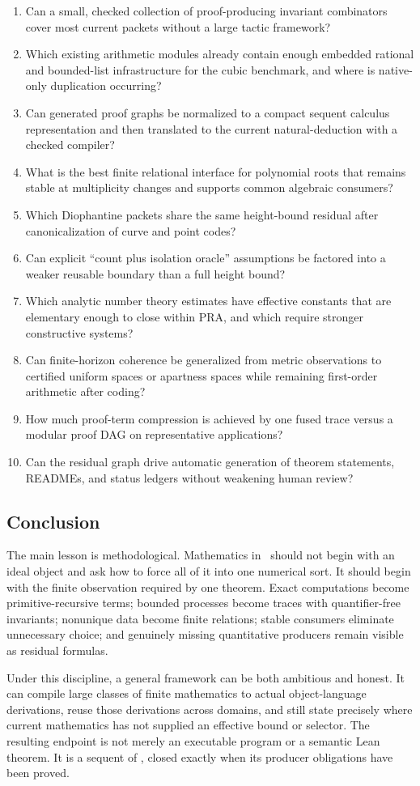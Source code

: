 \begin{enumerate}
\item Can a small, checked collection of proof-producing invariant combinators cover most current packets without a large tactic framework?
\item Which existing arithmetic modules already contain enough embedded rational and bounded-list infrastructure for the cubic benchmark, and where is native-only duplication occurring?
\item Can generated proof graphs be normalized to a compact sequent calculus representation and then translated to the current natural-deduction  with a checked compiler?
\item What is the best finite relational interface for polynomial roots that remains stable at multiplicity changes and supports common algebraic consumers?
\item Which Diophantine packets share the same height-bound residual after canonicalization of curve and point codes?
\item Can explicit ``count plus isolation oracle'' assumptions be factored into a weaker reusable boundary than a full height bound?
\item Which analytic number theory estimates have effective constants that are elementary enough to close within PRA, and which require stronger constructive systems?
\item Can finite-horizon coherence be generalized from metric observations to certified uniform spaces or apartness spaces while remaining first-order arithmetic after coding?
\item How much proof-term compression is achieved by one fused trace versus a modular proof DAG on representative applications?
\item Can the residual graph drive automatic generation of theorem statements, READMEs, and status ledgers without weakening human review?
\end{enumerate}

\subsection{Conclusion}

The main lesson is methodological.  Mathematics in \iPRA\ should not begin with an ideal object and ask how to force all of it into one numerical sort.  It should begin with the finite observation required by one theorem.  Exact computations become primitive-recursive terms; bounded processes become traces with quantifier-free invariants; nonunique data become finite relations; stable consumers eliminate unnecessary choice; and genuinely missing quantitative producers remain visible as residual formulas.

Under this discipline, a general framework can be both ambitious and honest.  It can compile large classes of finite mathematics to actual object-language derivations, reuse those derivations across domains, and still state precisely where current mathematics has not supplied an effective bound or selector.  The resulting endpoint is not merely an executable program or a semantic Lean theorem.  It is a sequent of \iPRA, closed exactly when its producer obligations have been proved.
